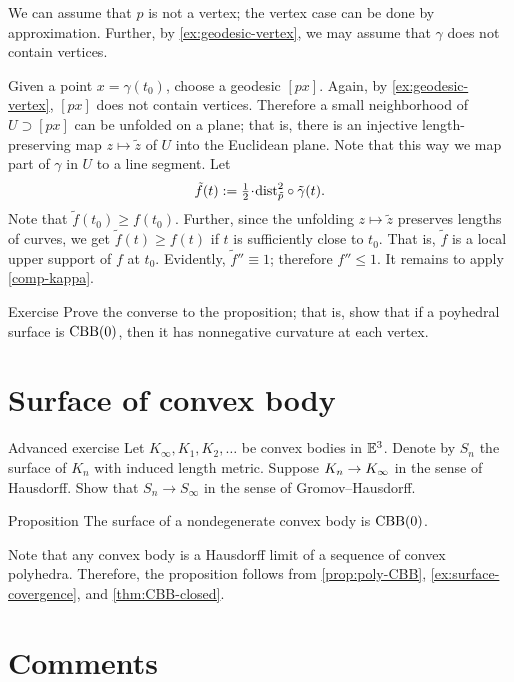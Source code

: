 We can assume that $p$ is not a vertex;
the vertex case can be done by approximation.
Further, by \ref{ex:geodesic-vertex}, we may assume that $\gamma$ does not contain vertices.

Given a point $x=\gamma(t_0)$, choose a geodesic $[px]$.
Again, by \ref{ex:geodesic-vertex}, $[px]$ does not contain vertices.
Therefore a small neighborhood of $U\supset [px]$ can be unfolded on a plane;
that is, there is an injective length-preserving map $z\mapsto \tilde z$
of $U$ into the Euclidean plane.
Note that this way we map part of $\gamma$ in $U$ to a line segment.
Let 
\[\tilde f(t)\df\tfrac12\cdot\distfun_{\tilde p}^2\circ\tilde \gamma(t).\]
Note that $\tilde f(t_0)\ge f(t_0)$.
Further, since the unfolding $z\mapsto \tilde z$ preserves lengths of curves, we get 
$\tilde f(t)\ge f(t)$ if $t$ is sufficiently close to $t_0$.
That is, $\tilde f$ is a local upper support of $f$ at $t_0$.
Evidently, $\tilde f''\equiv 1$; therefore $f''\le 1$.
It remains to apply \ref{comp-kappa}.
\qeds

\begin{thm}{Exercise}\label{ex:poly-CBB}
Prove the converse to the proposition;
that is, show that if a poyhedral surface is $\mathrm{CBB}(0)$, then it has nonnegative curvature at each vertex.
\end{thm}

\section{Surface of convex body}

\begin{thm}{Advanced exercise}\label{ex:surface-covergence}
Let $K_\infty,K_1,K_2,\dots$ be convex bodies in $\mathbb{E}^3$.
Denote by $S_n$ the surface of $K_n$ with induced length metric.
Suppose $K_n\z\to K_\infty$ in the sense of Hausdorff.
Show that $S_n\to S_\infty$ in the sense of Gromov--Hausdorff.
\end{thm}

\begin{thm}{Proposition}\label{prop:conv-surf-CBB(0)}
The surface of a nondegenerate convex body is $\mathrm{CBB}(0)$.
\end{thm}

Note that any convex body is a Hausdorff limit of a sequence of convex polyhedra.
Therefore, the proposition follows from \ref{prop:poly-CBB}, \ref{ex:surface-covergence}, and \ref{thm:CBB-closed}.

\section{Comments}

